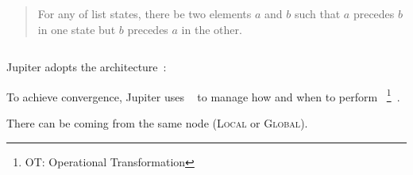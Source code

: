 \begin{frame}{}
  \centerline{}

  \vspace{0.40cm}
  \begin{quote}
    For any  of list states, there  be two elements $a$ and $b$ such that $a$ precedes $b$ in one state
    but $b$ precedes $a$ in the other.
  \end{quote}

  \vspace{0.30cm}
  \begin{columns}
      \vspace{-0.60cm}
      \vspace{-0.60cm}
  \end{columns}
\end{frame}
\begin{frame}{}
  \centerline{\large Jupiter adopts the  architecture~:}

  \begin{center}
    \begin{minipage}{0.50\textwidth}
      
    \end{minipage}
  \end{center}

  \vspace{-1.00cm}
\end{frame}

\begin{frame}{}
  \begin{center}
    {\large To achieve convergence, Jupiter uses ~
    to manage how and when to perform ~\footnote{OT: Operational Transformation}~.}
  \end{center}


  \begin{center} 
    There can be  coming from the same node ({\textsc{\footnotesize Local}} or \textsc{\footnotesize Global}).
  \end{center}
\end{frame}

